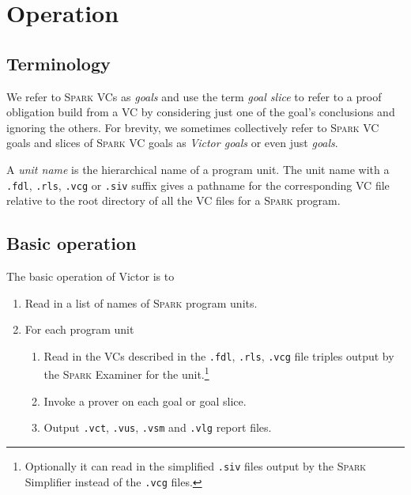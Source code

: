 \documentclass[12pt,fleqn]{article}
\newcommand{\spark}{\textsc{Spark}}
\begin{document}
\section{Operation}
\subsection{Terminology}
We refer to \spark{} VCs as \emph{goals} and use the term \emph{goal
  slice} to refer to a proof obligation build from a VC by considering
just one of the goal's conclusions and ignoring the others.  
%
For brevity, we sometimes collectively refer to \spark{} VC goals and
slices of \spark{} VC goals as \emph{Victor goals} or even just
\emph{goals}.

A \emph{unit name} is the hierarchical name of a program unit.  The unit
name with a \texttt{.fdl}, 
\texttt{.rls}, 
\texttt{.vcg} or 
\texttt{.siv} suffix gives a pathname for the corresponding
VC file relative to the root directory of all the VC files for a \spark{}
program.

\subsection{Basic operation}


The basic operation of Victor is to 
\begin{enumerate}
\item Read in a list of names of \spark{} program units.

\item For each program unit
  \begin{enumerate}
  \item Read in the VCs described in the \texttt{.fdl}, \texttt{.rls},
  \texttt{.vcg} file triples output by the \spark{} Examiner for the
  unit.\footnote{
  Optionally it can read in the simplified
  \texttt{.siv} files output by the \spark{} Simplifier instead of the 
  \texttt{.vcg} files.}
  \item Invoke a prover on each goal or goal slice. 
  \item Output \texttt{.vct}, \texttt{.vus}, \texttt{.vsm} and
    \texttt{.vlg} report files.
  \end{enumerate}
\end{enumerate}
\end{document}
